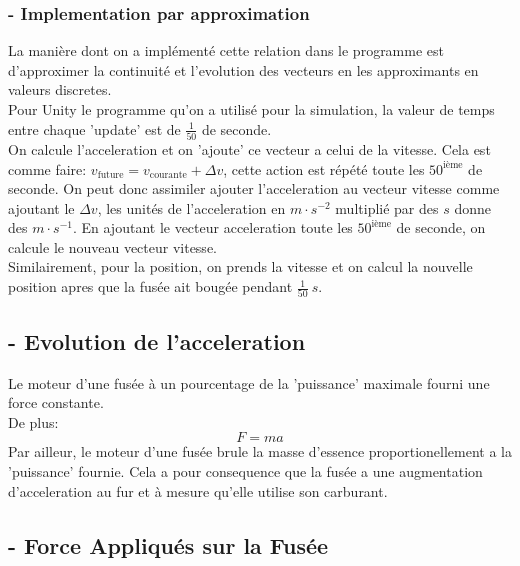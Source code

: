 \documentclass[a4paper, 12pt]{scrartcl}
\begin{document}
\subsubsection{- Implementation par approximation}
La manière dont on a implémenté cette relation dans le programme est d'approximer la 
continuité et l'evolution des vecteurs en les approximants en valeurs discretes. 
\\
Pour Unity le programme qu'on a utilisé pour la simulation, la valeur de temps entre chaque 'update' est de $\frac{1}{50}$ de seconde. 
\\
On calcule l'acceleration et on 'ajoute' ce vecteur a celui de la vitesse. Cela est comme faire: $v_{\text{future}} = v_{\text{courante}} + \Delta v$, cette action est répété
toute les $50^{\text{ième}}$ de seconde. On peut donc assimiler ajouter l'acceleration au vecteur vitesse comme ajoutant le $\Delta v$, 
les unités de l'acceleration en $m \cdot s^{-2}$ multiplié par des $s$ donne des $m \cdot s^{-1}$. En ajoutant le vecteur acceleration toute les $50^{\text{ième}}$ de seconde, 
on calcule le nouveau vecteur vitesse. 
\\
Similairement, pour la position, on prends la vitesse et on calcul la nouvelle position apres que la fusée
ait bougée pendant $\frac{1}{50}\ s$.

\subsection{- Evolution de l'acceleration}
Le moteur d'une fusée à un pourcentage de la 'puissance' maximale fourni une force
constante. 
\\
De plus:
\[F = ma \]
Par ailleur, le moteur d'une fusée brule la masse d'essence proportionellement a la 'puissance' fournie.
Cela a pour consequence que la fusée a une augmentation d'acceleration au fur et 
à mesure qu'elle utilise son carburant. 

\subsection{- Force Appliqués sur la Fusée}
\end{document}

